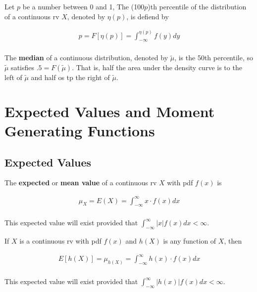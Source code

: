 \begin{definition}
    Let $p$ be a number between 0 and 1, The (100$p$)th percentile of the distribution of a continuous rv $X$, denoted by $\eta(p)$, is defiend by

    \begin{align*}
        p = F[\eta(p)] = \int_{-\infty}^{\eta(p)} f(y) dy \\
    \end{align*}
\end{definition}

\begin{definition}
    The \textbf{median} of a continuous distribution, denoted by $\tilde{\mu}$, is the 50th percentile, so $\tilde{\mu}$ satisfies $.5=F(\tilde{\mu})$. That is, half the area under the density curve is to the left of $\tilde{\mu}$ and half os tp the right of $\tilde{\mu}$.
\end{definition}

\section{Expected Values and Moment Generating Functions}

\subsection{Expected Values}

\begin{definition}
    The \textbf{expected} or \textbf{mean value} of a continuous rv $X$ with pdf $f(x)$ is

    \begin{align*}
        \mu_X = E(X) = \int_{-\infty}^\infty x\cdot f(x)dx \\
    \end{align*}

    This expected value will exist provided that $\int_{-\infty}^\infty |x|f(x)dx < \infty$.
\end{definition}

\begin{proposition}
    If $X$ is a continuous rv with pdf $f(x)$ and $h(X)$ is any function of $X$, then

    \begin{align*}
        E[h(X)] = \mu_{h(X)} = \int_{-\infty}^\infty h(x)\cdot f(x) dx \\
    \end{align*}

    This expected value will exist provided that $\int_{-\infty}^\infty |h(x)|f(x) dx < \infty$.
\end{proposition}

